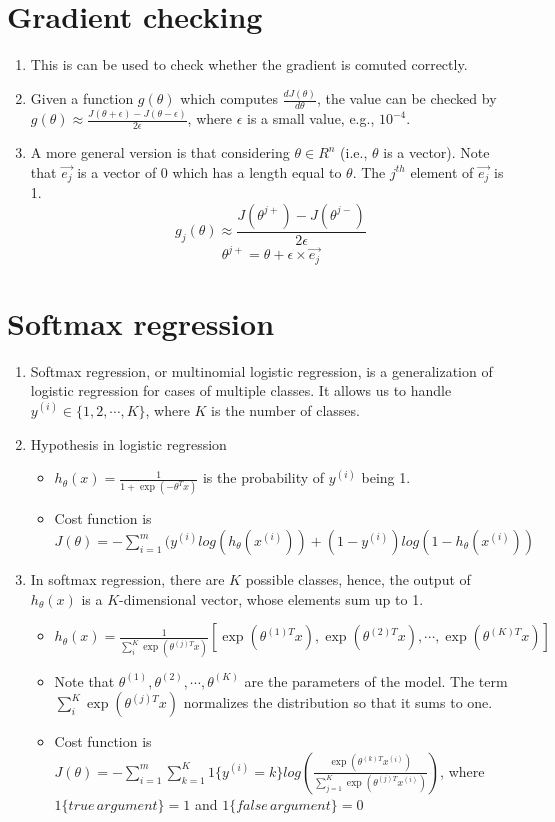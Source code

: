 \documentclass[12pt]{article}
\begin{document}
\section{Gradient checking}
\begin{enumerate}
 \item This is can be used to check whether the gradient is comuted correctly.
 \item Given a function $g(\theta)$ which computes $\frac{d J(\theta)}{d \theta}$, the value can be checked by $g(\theta) \approx \frac{J(\theta+\epsilon)-J(\theta-\epsilon)}{2 \epsilon}$, where $\epsilon$ is a small value, e.g., $10^{-4}$.
 \item A more general version is that considering $\theta \in R^n$ (i.e., $\theta$ is a vector). Note that $\overrightarrow{e_j}$ is a vector of 0 which has a length equal to $\theta$. The $j^{th}$ element of $\overrightarrow{e_j}$ is 1. 
 $$g_j (\theta) \approx \frac{J(\theta ^ {j+}) - J(\theta^{j-})}{2 \epsilon}$$ 
 $$\theta^{j+} = \theta + \epsilon \times \overrightarrow{e_j}$$
\end{enumerate}

\section{Softmax regression}
\begin{enumerate}
 \item Softmax regression, or multinomial logistic regression, is a generalization of logistic regression for cases of multiple classes. It allows us to handle $y^{(i)} \in \{ 1, 2, \cdots, K \}$, where $K$ is the number of classes.
 \item Hypothesis in logistic regression 
  \begin{itemize}
   \item $h_\theta (x) = \frac{1}{1 + \exp {(- \theta^T x)}}$ is the probability of $y^{(i)}$ being 1.
   \item Cost function is $J(\theta) = - \sum_{i=1}^{m} (y^{(i)} log (h_\theta(x^{(i)})) + (1-y^{(i)}) log (1-h_\theta (x^{(i)}))$
  \end{itemize}
 \item In softmax regression, there are $K$ possible classes, hence, the output of $h_\theta(x)$ is a $K$-dimensional vector, whose elements sum up to 1.
  \begin{itemize}
   \item $h_\theta (x) = \frac{1}{\sum_i^K \exp(\theta^{(j)T}x)} [\exp(\theta^{(1)T} x), \exp(\theta^{(2)T} x), \cdots, \exp(\theta^{(K)T} x)]$
   \item Note that $\theta^{(1)},\theta^{(2)},\cdots,\theta^{(K)}$ are the parameters of the model. The term $\sum_i^K \exp(\theta^{(j)T}x)$ normalizes the distribution so that it sums to one.
   \item Cost function is $J(\theta) = - \sum_{i=1}^m \sum_{k=1}^K 1 \{y^{(i)}=k\} log(\frac{\exp(\theta^{(k)T} x^{(i)})}{\sum_{j=1}^K \exp(\theta^{(j)T} x^{(i)})})$, where $1 \{true \,  argument\}=1$ and $1 \{false \, argument\}=0$
  \end{itemize}
\end{enumerate}
\end{document}
